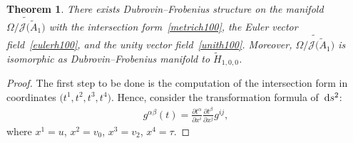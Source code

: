 \documentclass[pdftex]{sigma}%
\numberwithin{equation}{section}
\newtheorem{Theorem}{Theorem}[section]
\newcommand{\Ja}{\mathcal{J}}
\begin{document}
\begin{Theorem}\label{mainresult}
 There exists Dubrovin--Frobenius structure on the manifold $\widetilde{\Omega/\Ja\big(\tilde A_1\big)}$ with the intersection form~\eqref{metrich100}, the Euler vector field~\eqref{eulerh100}, and the unity vector field~\eqref{unith100}. Moreover, $\widetilde{\Omega/\Ja\big(\tilde A_1\big)}$ is isomorphic as Dubrovin--Frobenius manifold to $\widetilde H_{1,0,0}$.
\end{Theorem}

\begin{proof}
The first step to be done is the computation of the intersection form in coordinates $\big(t^1,t^2,t^3,t^4\big)$. Hence, consider the transformation formula of~${\rm d}s^2$:
\begin{gather}\label{metriceta}
g^{\alpha\beta}(t)=\frac{\partial t^\alpha}{\partial x^i}\frac{\partial t^\beta}{\partial x^j}g^{ij},
\end{gather}
where $x^1=u$, $x^2=v_0$, $x^3=v_2$, $x^4=\tau$.


\end{proof}
\end{document}
